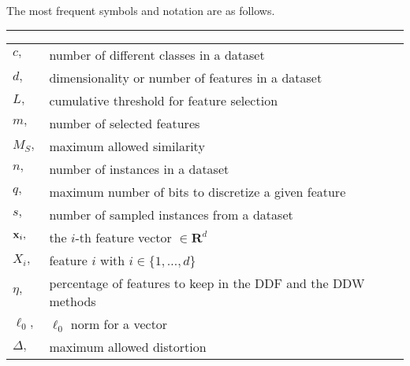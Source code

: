 \vspace{-2cm}
The most frequent symbols and notation are as follows.
\hrule
\begin{table}[h]
\begin{tabular}{@{}l@{\hspace{.5cm}}l} \\
$c,$	 		& number of different classes in a dataset \vspace{-2mm} \\
$d,$	 		& dimensionality or number of features in a dataset \vspace{-2mm} \\
$L,$ 			& cumulative threshold for feature selection \vspace{-2mm} \\
$m,$	 		& number of selected features \vspace{-2mm} \\
$M_S,$    & maximum allowed similarity \vspace{-2mm} \\  
$n,$	    & number of instances in a dataset \vspace{-2mm} \\
$q,$      & maximum number of bits to discretize a given feature \vspace{-2mm} \\
$s,$      & number of sampled instances from a dataset \vspace{-2mm} \\ 
${\bf x}_i,$  & the $i$-th feature vector $\in \mathbf{R}^d$ \vspace{-2mm} \\ 
$X_i,$ & feature $i$ with $i \in \{1,\ldots,d\}$ \vspace{1cm} \\ 

$\eta,$   & percentage of features to keep in the DDF and the DDW methods \vspace{-2mm} \\
$\ell_0,$ & $\ell_0$ norm for a vector \vspace{-2mm} \\
$\Delta,$  & maximum allowed distortion \vspace{1cm} \\


\end{tabular}
\end{table}
